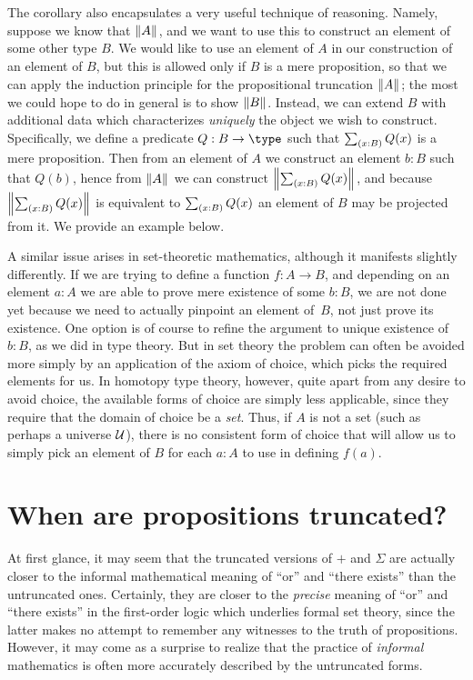 The corollary also encapsulates a very useful technique of reasoning.
Namely, suppose we know that $\mathopen{}\left\Vert A\right\Vert_{}\mathclose{}$, and we want to use this to construct an element of some other type $B$.
We would like to use an element of $A$ in our construction of an element of $B$, but this is allowed only if $B$ is a mere proposition, so that we can apply the induction principle for the propositional truncation $\mathopen{}\left\Vert A\right\Vert_{}\mathclose{}$; the most we could hope to do in general is to show $\mathopen{}\left\Vert B\right\Vert_{}\mathclose{}$.
%
Instead, we can extend $B$ with additional data which characterizes \emph{uniquely} the object we wish to construct.
Specifically, we define a predicate $Q:B\to\type$ such that $\sm{x:B} Q(x)$ is a mere proposition.
Then from an element of $A$ we construct an element $b:B$ such that $Q(b)$, hence from $\mathopen{}\left\Vert A\right\Vert_{}\mathclose{}$ we can construct $\brck{\sm{x:B} Q(x)}$, and because $\brck{\sm{x:B} Q(x)}$ is equivalent to $\sm{x:B} Q(x)$ an element of $B$ may be projected from it.
We provide an example below.

A similar issue arises in set-theoretic mathematics, although it manifests slightly
differently. If we are trying to define a function $f: A \to B$, and depending on an
element $a : A$ we are able to prove mere existence of some $b : B$, we are not done yet
because we need to actually pinpoint an element of~$B$, not just prove its existence.
One option is of course to refine the argument to unique existence of $b : B$, as we did in type theory. But in set theory the problem can often be avoided more simply by an application of the axiom of choice, which picks the required elements for us.
In homotopy type theory, however, quite apart from any desire to avoid choice, the available forms of choice are simply less applicable, since they require that the domain of choice be a \emph{set}.
Thus, if $A$ is not a set (such as perhaps a universe $\mathcal{U}$), there is no consistent form of choice that will allow us to simply pick an element of $B$ for each $a : A$ to use in defining $f(a)$.


\section{When are propositions truncated?}
\label{subsec:when-trunc}

At first glance, it may seem that the truncated versions of $+$ and $\Sigma$ are actually closer to the informal mathematical meaning of ``or'' and ``there exists'' than the untruncated ones.
Certainly, they are closer to the \emph{precise} meaning of ``or'' and ``there exists'' in the first-order logic which underlies formal set theory, since the latter makes no attempt to remember any witnesses to the truth of propositions.
However, it may come as a surprise to realize that the practice of \emph{informal} mathematics is often more accurately described by the untruncated forms.

